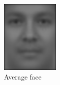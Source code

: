
\begin{figure}[hbt]
  \centering
  \includegraphics[width=0.25\textwidth]{../results/H_rez/mean_face.jpg}
  \caption{Average face}
  \label{fig:mean}
\end{figure}

~\vfill

